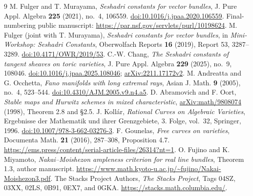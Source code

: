 \documentclass[11pt]{article}
\begin{document}
\begin{thebibliography}{9}
 M. Fulger and T. Murayama,
\emph{Seshadri constants for vector bundles}, J. Pure Appl. Algebra
\textbf{225} (2021), no.~4, 106559.
\href{https://doi.org/10.1016/j.jpaa.2020.106559}{doi:10.1016/j.jpaa.2020.106559}.
Final-numbering public manuscript:
\url{https://par.nsf.gov/servlets/purl/10198624}.
 M. Fulger (joint with T. Murayama),
\emph{Seshadri constants for vector bundles}, in
\emph{Mini-Workshop: Seshadri Constants}, Oberwolfach Reports
\textbf{16} (2019), Report 53, 3287--3289.
\href{https://doi.org/10.4171/OWR/2019/53}{doi:10.4171/OWR/2019/53}.
 C.-W. Chang,
\emph{The Seshadri constants of tangent sheaves on toric varieties},
J. Pure Appl. Algebra \textbf{229} (2025), no.~9, 108046.
\href{https://doi.org/10.1016/j.jpaa.2025.108046}{doi:10.1016/j.jpaa.2025.108046};
\href{https://arxiv.org/abs/2211.17172}{arXiv:2211.17172v2}.
 M. Andreatta and G. Occhetta,
\emph{Fano manifolds with long extremal rays}, Asian J. Math.
\textbf{9} (2005), no.~4, 523--544.
\href{https://doi.org/10.4310/AJM.2005.v9.n4.a5}{doi:10.4310/AJM.2005.v9.n4.a5}.
 D. Abramovich and F. Oort,
\emph{Stable maps and Hurwitz schemes in mixed characteristic},
\href{https://arxiv.org/abs/math/9808074}{arXiv:math/9808074} (1998),
Theorem 2.8 and \S2.5.
 J. Koll\'ar,
\emph{Rational Curves on Algebraic Varieties}, Ergebnisse der Mathematik
und ihrer Grenzgebiete, 3. Folge, vol.~32, Springer, 1996.
\href{https://doi.org/10.1007/978-3-662-03276-3}{doi:10.1007/978-3-662-03276-3}.
 F. Gounelas,
\emph{Free curves on varieties}, Documenta Math. \textbf{21} (2016),
287--308, Proposition 4.7.
\url{https://ems.press/content/serial-article-files/26314?nt=1}.
 O. Fujino and K. Miyamoto,
\emph{Nakai--Moishezon ampleness criterion for real line bundles},
Theorem 1.3, author manuscript.
\url{https://www.math.kyoto-u.ac.jp/~fujino/Nakai-Moishezon3.pdf}.
 The Stacks Project Authors, \emph{The Stacks Project},
Tags 04SZ, 03XX, 02LS, 0B91, 0EX7, and 0GKA.
\url{https://stacks.math.columbia.edu/}.
\end{thebibliography}
\end{document}
